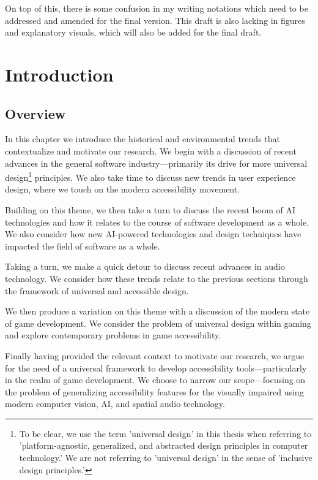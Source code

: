 \documentclass{report}
\begin{document}
On top of this, there is some confusion in my writing notations which need to be addressed and amended for the final version. This draft is also lacking in figures and explanatory visuals, which will also be added for the final draft.

\tableofcontents{} %
\newpage{} %



\chapter{Introduction}

\section{Overview}
In this chapter we introduce the historical and environmental trends that contextualize and motivate our research. We begin with a discussion of recent advances in the general software industry---primarily its drive for more universal design\footnote{To be clear, we use the term 'universal design' in this thesis when referring to 'platform-agnostic, generalized, and abstracted design principles in computer technology.' We are not referring to 'universal design' in the sense of 'inclusive design principles.'} principles. We also take time to discuss new trends in user experience design, where we touch on the modern accessibility movement.

Building on this theme, we then take a turn to discuss the recent boom of AI technologies and how it relates to the course of software development as a whole. We also consider how new AI-powered technologies and design techniques have impacted the field of software as a whole.

Taking a turn, we make a quick detour to discuss recent advances in audio technology. We consider how these trends relate to the previous sections through the framework of universal and accessible design.

We then produce a variation on this theme with a discussion of the modern state of game development. We consider the problem of universal design within gaming and explore contemporary problems in game accessibility. 

Finally having provided the relevant context to motivate our research, we argue for the need of a universal framework to develop accessibility tools---particularly in the realm of game development. We choose to narrow our scope---focusing on the problem of generalizing accessibility features for the visually impaired using modern computer vision, AI, and spatial audio technology. 
\end{document}
